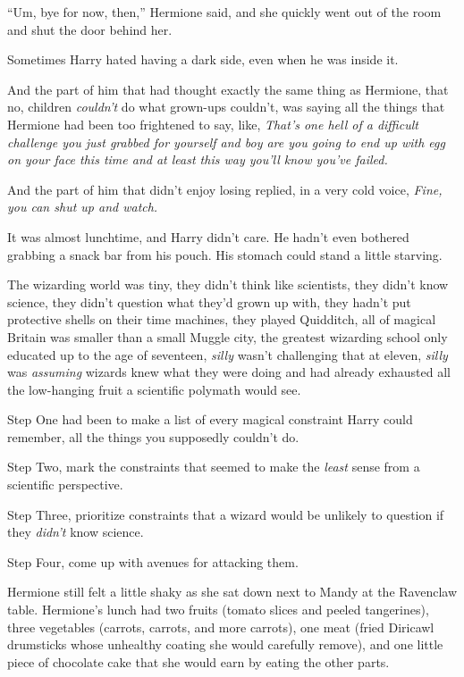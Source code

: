 “Um, bye for now, then,” Hermione said, and she quickly went out of the room and shut the door behind her.

Sometimes Harry hated having a dark side, even when he was inside it.

And the part of him that had thought exactly the same thing as Hermione, that no, children \emph{couldn’t} do what grown-ups couldn’t, was saying all the things that Hermione had been too frightened to say, like, \emph{That’s one hell of a difficult challenge you just grabbed for yourself \emph{and} boy are you going to end up with egg on your face this time \emph{and} at least this way you’ll know you’ve failed.}

And the part of him that didn’t enjoy losing replied, in a very cold voice, \emph{Fine, you can shut up and watch.}

\later

It was almost lunchtime, and Harry didn’t care. He hadn’t even bothered grabbing a snack bar from his pouch. His stomach could stand a little starving.

The wizarding world was tiny, they didn’t think like scientists, they didn’t know science, they didn’t question what they’d grown up with, they hadn’t put protective shells on their time machines, they played Quidditch, all of magical Britain was smaller than a small Muggle city, the greatest wizarding school only educated up to the age of seventeen, \emph{silly} wasn’t challenging that at eleven, \emph{silly} was \emph{assuming} wizards knew what they were doing and had already exhausted all the low-hanging fruit a scientific polymath would see.

Step One had been to make a list of every magical constraint Harry could remember, all the things you supposedly couldn’t do.

Step Two, mark the constraints that seemed to make the \emph{least} sense from a scientific perspective.

Step Three, prioritize constraints that a wizard would be unlikely to question if they \emph{didn’t} know science.

Step Four, come up with avenues for attacking them.

\later

Hermione still felt a little shaky as she sat down next to Mandy at the Ravenclaw table. Hermione’s lunch had two fruits (tomato slices and peeled tangerines), three vegetables (carrots, carrots, and more carrots), one meat (fried Diricawl drumsticks whose unhealthy coating she would carefully remove), and one little piece of chocolate cake that she would earn by eating the other parts.

